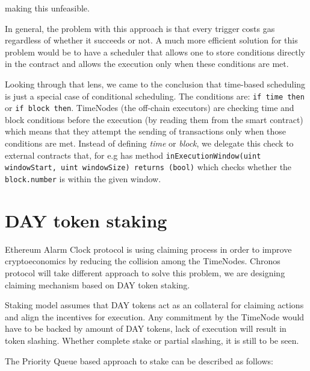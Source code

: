 \documentclass{report}
\begin{document}
  making this unfeasible.

  In general, the problem with this approach is that every trigger costs gas regardless of whether it succeeds or not. A much more efficient solution for this problem would be to have a scheduler that allows one to store conditions directly in the contract and allows the execution only when these conditions are met.

  Looking through that lens, we came to the conclusion that time-based scheduling is just a special case of conditional scheduling. The conditions are: \texttt{if time then} or \texttt{if block then}. TimeNodes (the off-chain executors) are checking time and block conditions before the execution (by reading them from the smart contract) which means that they attempt the sending of transactions only when those conditions are met. Instead of defining \textit{time} or \textit{block}, we delegate this check to external contracts that, for e.g has method \texttt{inExecutionWindow(uint windowStart, uint windowSize) returns (bool)} which checks whether the \texttt{block.number} is within the given window.

  \section{DAY token staking}

  Ethereum Alarm Clock protocol is using claiming process in order to improve cryptoeconomics by reducing the collision among the TimeNodes. Chronos protocol will take different approach to solve this problem, we are designing claiming mechanism based on DAY token staking.

  Staking model assumes that DAY tokens act as an collateral for claiming actions and align the incentives for execution. Any commitment by the TimeNode would have to be backed by amount of DAY tokens, lack of execution will result in token slashing. Whether complete stake or partial slashing, it is still to be seen.

  The Priority Queue based approach to stake can be described as follows:
\end{document}
